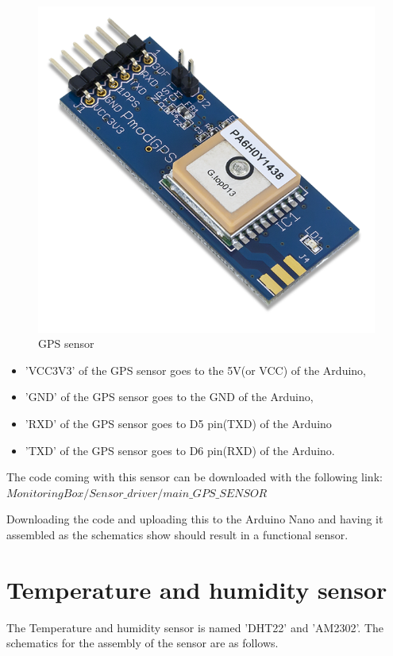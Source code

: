 \documentclass{report}
\begin{document}
\begin{figure}[H]
\begin{center}
\includegraphics[scale=1]{images/GPSsensor.png}
\caption{GPS sensor}
\end{center}
\end{figure}


\begin{itemize}
\item 'VCC3V3' of the GPS sensor goes to the 5V(or VCC) of the Arduino, 
\item 'GND' of the GPS sensor goes to the GND of the Arduino,
\item 'RXD' of the GPS sensor goes to D5 pin(TXD) of the Arduino 
\item 'TXD' of the GPS sensor goes to D6 pin(RXD) of the Arduino. 
\end{itemize}

The code coming with this sensor can be downloaded with the following link: $ MonitoringBox/Sensor\_driver/main\_GPS\_SENSOR $


Downloading the code and uploading this to the Arduino Nano and having it assembled as the schematics show should result in a functional sensor. 





\chapter{Temperature and humidity sensor}
The Temperature and humidity sensor is named 'DHT22' and 'AM2302'. The schematics for the assembly of the sensor are as follows.\\
\end{document}
